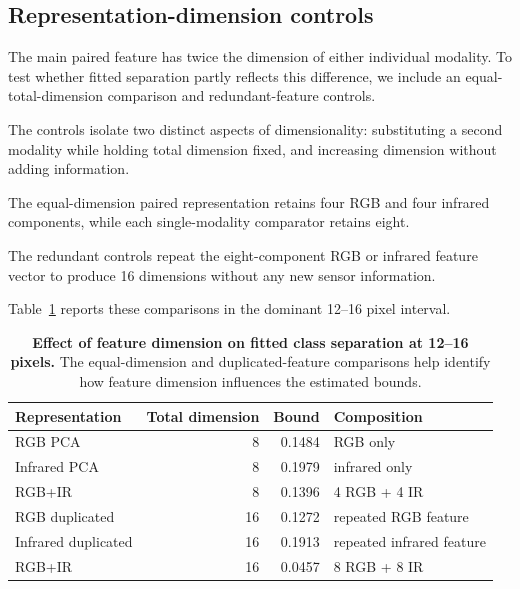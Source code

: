 \documentclass[10pt]{article}
\begin{document}
\subsection{Representation-dimension controls}

The main paired feature has twice the dimension of either individual modality. To test whether fitted separation partly reflects this difference, we include an equal-total-dimension comparison and redundant-feature controls.

The controls isolate two distinct aspects of dimensionality: substituting a second modality while holding total dimension fixed, and increasing dimension without adding information.

The equal-dimension paired representation retains four RGB and four infrared components, while each single-modality comparator retains eight.

The redundant controls repeat the eight-component RGB or infrared feature vector to produce 16 dimensions without any new sensor information.

Table~\ref{tab:dimcontrol} reports these comparisons in the dominant 12--16 pixel interval.

\begin{table}[h]
\centering
\caption{\textbf{Effect of feature dimension on fitted class separation at 12--16 pixels.}
The equal-dimension and duplicated-feature comparisons help identify how feature dimension influences the estimated bounds.}
\label{tab:dimcontrol}
\small
\begin{tabular}{lrrl}
\toprule
Representation & Total dimension & Bound & Composition \\
\midrule
RGB PCA
& 8 & 0.1484 & RGB only \\

Infrared PCA
& 8 & 0.1979 & infrared only \\

RGB+IR
& 8 & 0.1396 & 4 RGB + 4 IR \\

RGB duplicated
& 16 & 0.1272 & repeated RGB feature \\

Infrared duplicated
& 16 & 0.1913 & repeated infrared feature \\

RGB+IR
& 16 & 0.0457 & 8 RGB + 8 IR \\
\bottomrule
\end{tabular}
\end{table}
\end{document}
